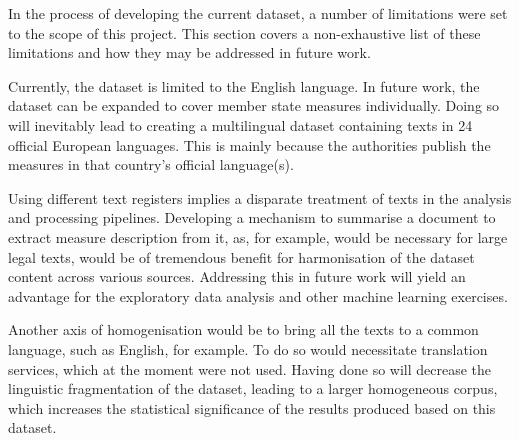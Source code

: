 In the process of developing the current dataset, a number of limitations were set to the scope of this project. This section covers a non-exhaustive list of these limitations and how they may be addressed in future work.

Currently, the dataset is limited to the English language. In future work, the dataset can be expanded to cover member state measures individually. Doing so will inevitably lead to creating a multilingual dataset containing texts in 24 official European languages. This is mainly because the authorities publish the measures in that country's official language(s).

Using different text registers implies a disparate treatment of texts in the analysis and processing pipelines. Developing a mechanism to summarise a document to extract measure description from it, as, for example, would be necessary for large legal texts, would be of tremendous benefit for harmonisation of the dataset content across various sources. Addressing this in future work will yield an advantage for the exploratory data analysis and other machine learning exercises.

Another axis of homogenisation would be to bring all the texts to a common language, such as English, for example. To do so would necessitate translation services, which at the moment were not used. Having done so will decrease the linguistic fragmentation of the dataset, leading to a larger homogeneous corpus, which increases the statistical significance of the results produced based on this dataset.

\enlargethispage{2em}
